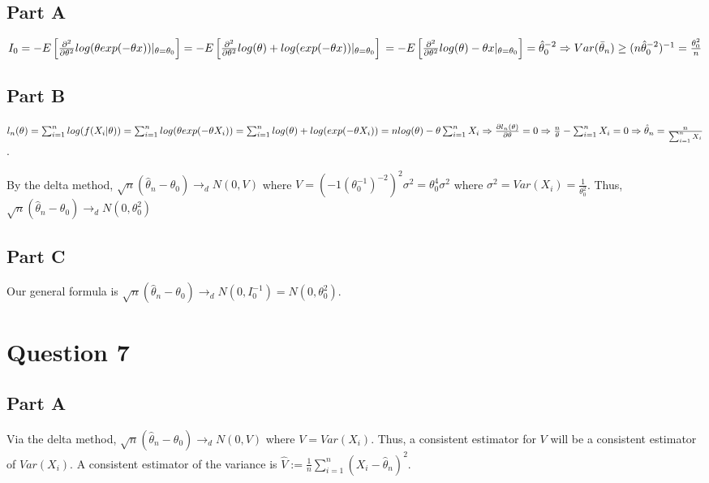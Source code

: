 \documentclass[11pt]{article} %
\begin{document}
\subsection{Part A}
$I_0 = -E\left[ \frac{\partial^2}{\partial \theta^2} log(\theta exp(-\theta x))|_{\theta = \theta_0} \right] = -E\left[ \frac{\partial^2}{\partial \theta^2} log(\theta)+ log(exp(-\theta x)) |_{\theta = \theta_0}\right] \\= -E\left[ \frac{\partial^2}{\partial \theta^2} log(\theta)-\theta x |_{\theta = \theta_0}\right] = \hat{\theta}^{-2}_0 \Rightarrow Var(\bar{\theta}_n) \geq (n \hat{\theta}^{-2}_0)^{-1} = \frac{ \theta^{2}_0}{n}$
\subsection{Part B}
$l_n(\theta) = \sum_{i=1}^nlog(f(X_i|\theta)) = \sum_{i=1}^nlog(\theta exp(-\theta X_i)) = \sum_{i=1}^nlog(\theta)+ log(exp(-\theta X_i)) \\ = nlog(\theta)- \theta\sum_{i=1}^n X_i \Rightarrow \frac{\partial l_n(\theta)}{\partial \theta} = 0 \Rightarrow \frac{n}{\theta} - \sum_{i=1}^n X_i = 0 \Rightarrow \hat{\theta}_n =  \frac{n}{\sum_{i=1}^n X_i}$. 

By the delta method, $\sqrt{n}(\hat{\theta}_n - \theta_0) \rightarrow_d N(0,V)$ where $V = (-1(\theta_0^{-1})^{-2})^2 \sigma^2 = \theta_0^{4}\sigma^2$ where $\sigma^2 = Var(X_i) =  \frac{1}{\theta_0^2}$. Thus, $\sqrt{n}(\hat{\theta}_n - \theta_0) \rightarrow_d N(0,\theta_0^{2})$
\subsection{Part C}
Our general formula is $\sqrt{n}(\hat{\theta}_n - \theta_0) \rightarrow_d N(0,I_0^{-1}) = N(0,\theta_0^2)$.
\section{Question 7} %
\subsection{Part A}
Via the delta method, $\sqrt{n}(\hat{\theta}_n - \theta_0) \rightarrow_d N(0,V)$ where $V = Var(X_i).$ Thus, a consistent estimator for $V$ will be a consistent estimator of $Var(X_i).$ A consistent estimator of the variance is $\hat{V} := \frac{1}{n}\sum_{i=1}^{n}(X_i - \hat{\theta}_n)^2$.
\end{document}
